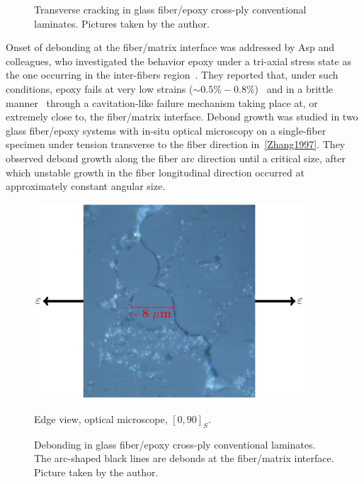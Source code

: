 \begin{figure}[!h]
\caption{Transverse cracking in glass fiber/epoxy cross-ply conventional laminates. Pictures taken by the author.}\label{intro:fig:transversecracks}
\end{figure}

Onset of debonding at the fiber/matrix interface was addressed by Asp and colleagues, who investigated the behavior epoxy under a tri-axial stress state as the one occurring in the inter-fibers region~\cite{Asp1995}. They reported that, under such conditions, epoxy fails at very low strains ($\sim0.5\%-0.8\%$)~\cite{Asp1995} and in a brittle manner~\cite{Asp1996} through a cavitation-like failure mechanism taking place at, or extremely close to, the fiber/matrix interface. Debond growth was studied in two glass fiber/epoxy systems with in-situ optical microscopy on a single-fiber specimen under tension transverse to the fiber direction in~\ref{Zhang1997}. They observed debond growth along the fiber arc direction until a critical size, after which unstable growth in the fiber longitudinal direction occurred at approximately constant angular size. 

\begin{figure}[!h]
\centering
        \includegraphics[width=0.9\textwidth]{pics/transversecracks-micro.pdf}
       \caption{Edge view, optical microscope, $\left[0,90\right]_{S}$.}
\caption{Debonding in glass fiber/epoxy cross-ply conventional laminates. The arc-shaped black lines are debonds at the fiber/matrix interface. Picture taken by the author.}\label{intro:fig:debonding}
\end{figure}



